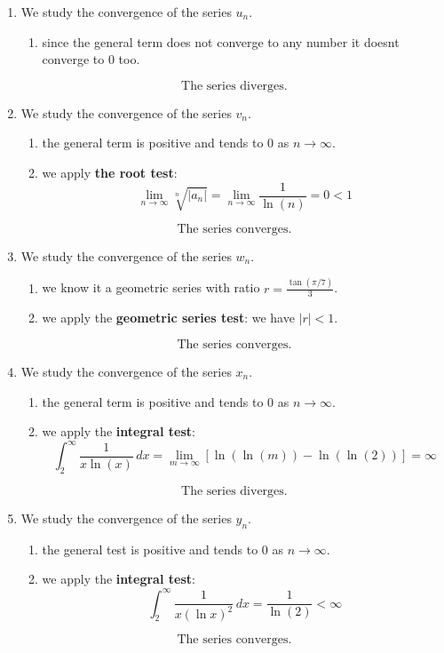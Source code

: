 \documentclass[12pt]{article}
\begin{document}
\begin{correctionbox}
\begin{enumerate}
    \item We study the convergence of the series $u_n$.
    \begin{enumerate}
        \item since the general term does not converge to any number it doesnt converge to 0 too.
    \end{enumerate}
    \[\boxed{\text{The series diverges.}}\]

    \item We study the convergence of the series $v_n$.
    \begin{enumerate}
        \item the general term is positive and tends to 0 as $n \to \infty$.
        \item we apply \textbf{the root test}: \[\lim_{n \to \infty} \sqrt[n]{|a_n|} = \lim_{n \to \infty} \frac{1}{\ln(n)} = 0 < 1\]
    \end{enumerate}
    \[\boxed{\text{The series converges.}}\]

    \item We study the convergence of the series $w_n$.
    \begin{enumerate}
        \item we know it a geometric series with ratio $r = \frac{\tan(\pi/7)}{3}$.
        \item we apply the \textbf{geometric series test}: we have  $|r| < 1$.
    \end{enumerate}
    \[\boxed{\text{The series converges.}}\]
    
    \item We study the convergence of the series $x_n$.
    \begin{enumerate}
        \item the general term is positive and tends to 0 as $n \to \infty$.
        \item we apply the \textbf{integral test}: \[\int_{2}^{\infty} \frac{1}{x \ln(x)} \, dx = \lim_{m \to \infty} [\ln(\ln(m)) - \ln(\ln(2))] = \infty\]
    \end{enumerate}
    \[\boxed{\text{The series diverges.}}\]

    \item We study the convergence of the series $y_n$.
    \begin{enumerate}
        \item the general test is positive and tends to 0 as $n \to \infty$.
        \item we apply the \textbf{integral test}: \[\int_{2}^{\infty} \frac{1}{x(\ln x)^2} \, dx = \frac{1}{\ln(2)} < \infty\]
    \end{enumerate}
    \[\boxed{\text{The series converges.}}\]


\end{enumerate}
\end{correctionbox}
\end{document}
